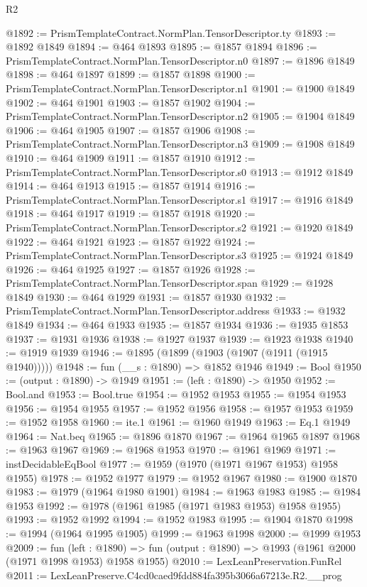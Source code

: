 \begin{lexlean}{R2}
\begin{coremodule}
@1892 := PrismTemplateContract.NormPlan.TensorDescriptor.ty
@1893 := @1892 @1849
@1894 := @464 @1893
@1895 := @1857 @1894
@1896 := PrismTemplateContract.NormPlan.TensorDescriptor.n0
@1897 := @1896 @1849
@1898 := @464 @1897
@1899 := @1857 @1898
@1900 := PrismTemplateContract.NormPlan.TensorDescriptor.n1
@1901 := @1900 @1849
@1902 := @464 @1901
@1903 := @1857 @1902
@1904 := PrismTemplateContract.NormPlan.TensorDescriptor.n2
@1905 := @1904 @1849
@1906 := @464 @1905
@1907 := @1857 @1906
@1908 := PrismTemplateContract.NormPlan.TensorDescriptor.n3
@1909 := @1908 @1849
@1910 := @464 @1909
@1911 := @1857 @1910
@1912 := PrismTemplateContract.NormPlan.TensorDescriptor.s0
@1913 := @1912 @1849
@1914 := @464 @1913
@1915 := @1857 @1914
@1916 := PrismTemplateContract.NormPlan.TensorDescriptor.s1
@1917 := @1916 @1849
@1918 := @464 @1917
@1919 := @1857 @1918
@1920 := PrismTemplateContract.NormPlan.TensorDescriptor.s2
@1921 := @1920 @1849
@1922 := @464 @1921
@1923 := @1857 @1922
@1924 := PrismTemplateContract.NormPlan.TensorDescriptor.s3
@1925 := @1924 @1849
@1926 := @464 @1925
@1927 := @1857 @1926
@1928 := PrismTemplateContract.NormPlan.TensorDescriptor.span
@1929 := @1928 @1849
@1930 := @464 @1929
@1931 := @1857 @1930
@1932 := PrismTemplateContract.NormPlan.TensorDescriptor.address
@1933 := @1932 @1849
@1934 := @464 @1933
@1935 := @1857 @1934
@1936 := @1935 @1853
@1937 := @1931 @1936
@1938 := @1927 @1937
@1939 := @1923 @1938
@1940 := @1919 @1939
@1946 := @1895 (@1899 (@1903 (@1907 (@1911 (@1915 @1940)))))
@1948 := fun (__s : @1890) => @1852 @1946
@1949 := Bool
@1950 := (output : @1890) -> @1949
@1951 := (left : @1890) -> @1950
@1952 := Bool.and
@1953 := Bool.true
@1954 := @1952 @1953
@1955 := @1954 @1953
@1956 := @1954 @1955
@1957 := @1952 @1956
@1958 := @1957 @1953
@1959 := @1952 @1958
@1960 := ite.{1}
@1961 := @1960 @1949
@1963 := Eq.{1} @1949
@1964 := Nat.beq
@1965 := @1896 @1870
@1967 := @1964 @1965 @1897
@1968 := @1963 @1967
@1969 := @1968 @1953
@1970 := @1961 @1969
@1971 := instDecidableEqBool
@1977 := @1959 (@1970 (@1971 @1967 @1953) @1958 @1955)
@1978 := @1952 @1977
@1979 := @1952 @1967
@1980 := @1900 @1870
@1983 := @1979 (@1964 @1980 @1901)
@1984 := @1963 @1983
@1985 := @1984 @1953
@1992 := @1978 (@1961 @1985 (@1971 @1983 @1953) @1958 @1955)
@1993 := @1952 @1992
@1994 := @1952 @1983
@1995 := @1904 @1870
@1998 := @1994 (@1964 @1995 @1905)
@1999 := @1963 @1998
@2000 := @1999 @1953
@2009 := fun (left : @1890) =>
  fun (output : @1890) => @1993 (@1961 @2000 (@1971 @1998 @1953) @1958 @1955)
@2010 := LexLeanPreservation.FunRel
@2011 := LexLeanPreserve.C4cd0caed9fdd884fa395b3066a67213e.R2.__prog

\end{coremodule}
\end{lexlean}
